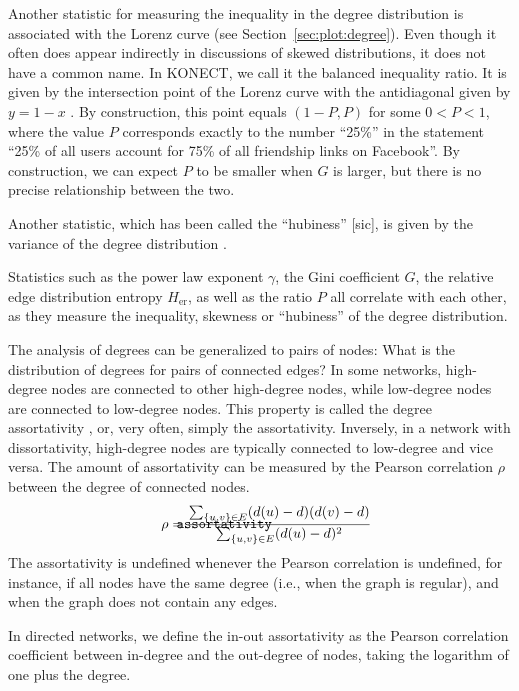 \documentclass{article}
\def\mathnote#1{%
  \tag*{\rlap{\hspace\marginparsep\smash{\parbox[t]{\marginparwidth}{#1}}}}
}
\begin{document}
Another statistic for  measuring the inequality
in the degree distribution is associated with the Lorenz curve (see
Section~\ref{sec:plot:degree}).  Even though it often does appear
indirectly in discussions of skewed distributions, it does not have a
common name.  In KONECT, we call it the balanced inequality ratio. 
It is given by the intersection point
of the Lorenz curve with the antidiagonal given by $y = 1 - x$
\citep{kunegis:power-law}.  By construction, this point equals $(1-P, P)$
for some $0<P<1$, where the value $P$ corresponds exactly to the number
``25\%'' in the statement ``25\% of all users account for 75\% of all
friendship links on Facebook''.  By construction, we can expect $P$ to
be smaller when $G$ is larger, but there is no precise relationship
between the two.

Another statistic, which has been called the ``hubiness'' [sic], is given by
the variance of the degree distribution \cite[e.g. by][]{b883,b884}.

Statistics such as the power law exponent $\gamma$, the Gini coefficient
$G$, the relative edge distribution entropy $H_{\mathrm{er}}$, as well
as the ratio $P$ all correlate with each other, as they measure the
inequality, skewness or ``hubiness'' of the degree distribution. 

The analysis of degrees can be generalized to pairs of nodes:  What is
the distribution of degrees for pairs of connected edges?  In some
networks, high-degree nodes are connected to other high-degree nodes,
while low-degree nodes are connected to low-degree nodes.  This property
is called the degree assortativity \citep{b854}, or, very often, simply the
assortativity.  Inversely, in a network with dissortativity,  
high-degree nodes are typically connected to low-degree and vice versa.
The amount of assortativity can be measured by the Pearson correlation
$\rho$ between the degree of connected nodes.  
\begin{align}
  \mathnote{\texttt{assortativity}} 
  \rho &= \frac
  {\sum_{\{u,v\} \in E} (d(u) - d)(d(v) - d)}
  {\sum_{\{u,v\} \in E} (d(u) - d)^2}
\end{align}
The assortativity is
undefined whenever the Pearson correlation is undefined, for instance,
if all nodes have the same degree (i.e., when the graph is regular), and
when the graph does not contain any edges. 

In directed networks, we define the in-out assortativity as the Pearson
correlation coefficient between in-degree and the out-degree of nodes,
taking the logarithm of one plus the degree.
\end{document}
